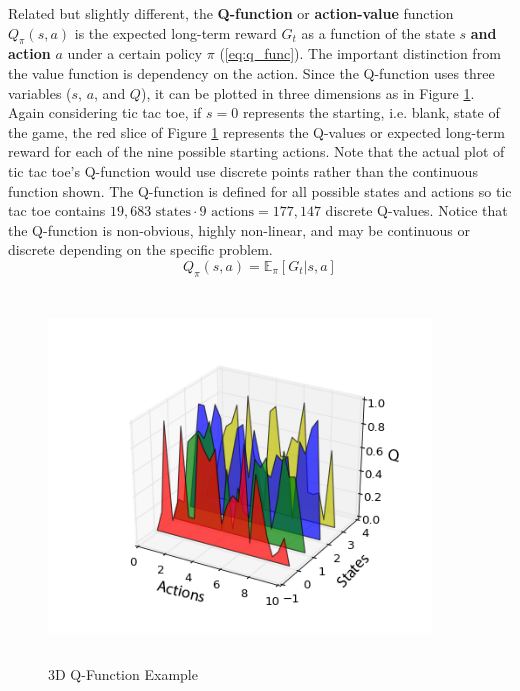 Related but slightly different, the \textbf{Q-function} or \textbf{action-value} function $	Q_\pi(s,a)$ is the expected long-term reward $G_t$ as a function of the state $s$ \textbf{and action} $a$ under a certain policy $\pi$ (\ref{eq:q_func}). The important distinction from the value function is dependency on the action. Since the Q-function uses three variables ($s$, $a$, and $Q$), it can be plotted in three dimensions as in Figure \ref{fig:q_ex_plot}. Again considering tic tac toe, if $s=0$ represents the starting, i.e. blank, state of the game, the red slice of Figure \ref{fig:q_ex_plot} represents the Q-values or expected long-term reward for each of the nine possible starting actions. Note that the actual plot of tic tac toe's Q-function would use discrete points rather than the continuous function shown. The Q-function is defined for all possible states and actions so tic tac toe contains $19,683 \text{ states} \cdot 9 \text{ actions} = 177,147$ discrete Q-values. Notice that the Q-function is non-obvious, highly non-linear, and may be continuous or discrete depending on the specific problem.
\begin{equation}
	\label{eq:q_func}
	Q_\pi(s,a)=\mathbb{E}_\pi [G_t |s,a]
\end{equation}
\begin{figure}[H]   %
	\centering \includegraphics[width=4in, height=3.85in, keepaspectratio]{figures/q_ex_plot.png}
	\caption{3D Q-Function Example}\label{fig:q_ex_plot}
\end{figure}


